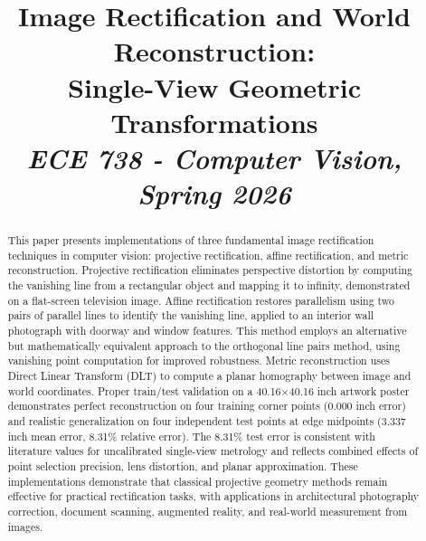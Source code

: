 \documentclass[conference]{IEEEtran}
\begin{document}
\title{Image Rectification and World Reconstruction:\\
Single-View Geometric Transformations\\
{\normalsize \textit{ECE 738 - Computer Vision, Spring 2026}}}
\author{
}
\maketitle
\thispagestyle{plain}
\begin{abstract}
This paper presents implementations of three fundamental image rectification techniques in computer vision: projective rectification, affine rectification, and metric reconstruction. Projective rectification eliminates perspective distortion by computing the vanishing line from a rectangular object and mapping it to infinity, demonstrated on a flat-screen television image. Affine rectification restores parallelism using two pairs of parallel lines to identify the vanishing line, applied to an interior wall photograph with doorway and window features. This method employs an alternative but mathematically equivalent approach to the orthogonal line pairs method, using vanishing point computation for improved robustness. Metric reconstruction uses Direct Linear Transform (DLT) to compute a planar homography between image and world coordinates. Proper train/test validation on a 40.16×40.16 inch artwork poster demonstrates perfect reconstruction on four training corner points (0.000 inch error) and realistic generalization on four independent test points at edge midpoints (3.337 inch mean error, 8.31\% relative error). The 8.31\% test error is consistent with literature values for uncalibrated single-view metrology and reflects combined effects of point selection precision, lens distortion, and planar approximation. These implementations demonstrate that classical projective geometry methods remain effective for practical rectification tasks, with applications in architectural photography correction, document scanning, augmented reality, and real-world measurement from images.
\end{abstract}

\newpage

\balance
\end{document}
